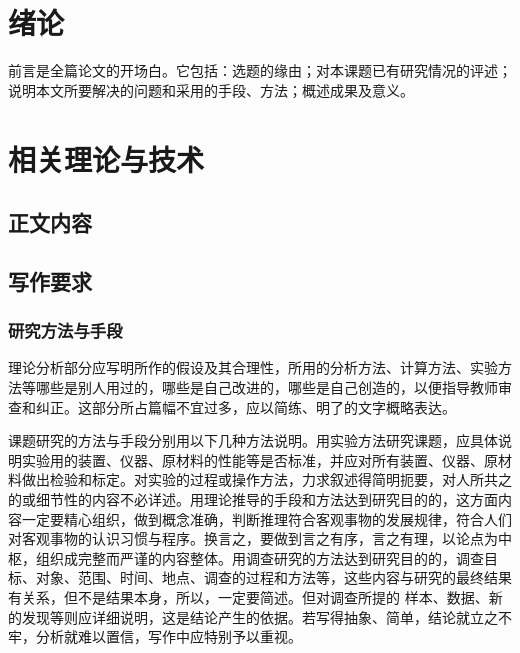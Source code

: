 \xfbody

\chapter{绪论}

前言是全篇论文的开场白。它包括：选题的缘由；对本课题已有研究情况的评述；说明本文所要解决的问题和采用的手段、方法；概述成果及意义。

\chapter{相关理论与技术}


\section{正文内容}


\section{写作要求}

\subsection{研究方法与手段}



理论分析部分应写明所作的假设及其合理性，所用的分析方法、计算方法、实验方法等哪些是别人用过的，哪些是自己改进的，哪些是自己创造的，以便指导教师审查和纠正。这部分所占篇幅不宜过多，应以简练、明了的文字概略表达。

课题研究的方法与手段分别用以下几种方法说明。用实验方法研究课题，应具体说明实验用的装置、仪器、原材料的性能等是否标准，并应对所有装置、仪器、原材料做出检验和标定。对实验的过程或操作方法，力求叙述得简明扼要，对人所共之的或细节性的内容不必详述。用理论推导的手段和方法达到研究目的的，这方面内容一定要精心组织，做到概念准确，判断推理符合客观事物的发展规律，符合人们对客观事物的认识习惯与程序。换言之，要做到言之有序，言之有理，以论点为中枢，组织成完整而严谨的内容整体。用调查研究的方法达到研究目的的，调查目标、对象、范围、时间、地点、调查的过程和方法等，这些内容与研究的最终结果有关系，但不是结果本身，所以，一定要简述。但对调查所提的 样本、数据、新的发现等则应详细说明，这是结论产生的依据。若写得抽象、简单，结论就立之不牢，分析就难以置信，写作中应特别予以重视。

